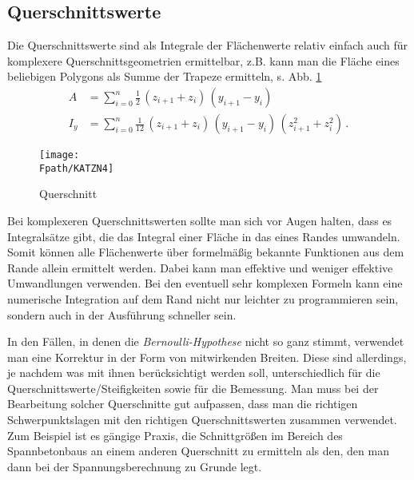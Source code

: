 {\textcolor{sectionTitleBlue}{\subsection{Querschnittswerte}}}
Die Querschnittswerte sind als Integrale der Fl\"{a}chenwerte relativ einfach auch f\"{u}r komplexere Querschnittsgeometrien ermittelbar, z.B. kann man die Fl\"{a}che eines beliebigen Polygons als Summe der Trapeze ermitteln, s. Abb. \ref{KatzN4}
\begin{align}
A &= \sum_{i = 0}^n \frac{1}{2}\,(z_{i+1} + z_i)\,(y_{i+1} - y_i) \\
I_y &= \sum_{i = 0}^n \frac{1}{12}\, (z_{i+1} + z_i)\,(y_{i+1} - y_i)\,(z_{i+1}^2 +
z_i^2)\,.
\end{align}
\begin{figure}[tbp] \centering
\if {} \sidecaption \fi
\texttt{[image: \\Fpath/KATZN4]}
\caption{Querschnitt}
\label{KatzN4}%
\end{figure}%

Bei komplexeren Querschnittswerten sollte man sich vor Augen halten, dass es Integrals\"{a}tze gibt, die das Integral einer Fl\"{a}che in das eines Randes umwandeln. Somit k\"{o}nnen alle Fl\"{a}chenwerte \"{u}ber formelm\"{a}{\ss}ig bekannte Funktionen aus dem Rande allein ermittelt werden. Dabei kann man effektive und weniger effektive Umwandlungen verwenden. Bei den eventuell sehr komplexen Formeln kann eine numerische Integration auf dem Rand nicht nur leichter zu programmieren sein, sondern auch in der Ausf\"{u}hrung schneller sein.

In den F\"{a}llen, in denen die {\em Bernoulli-Hypothese\/} nicht so ganz stimmt, verwendet man eine Korrektur in der Form von mitwirkenden Breiten. Diese sind allerdings, je nachdem was mit ihnen ber\"{u}cksichtigt werden soll, unterschiedlich f\"{u}r die Querschnittswerte/Steifigkeiten sowie f\"{u}r die Bemessung. Man muss bei der Bearbeitung solcher Querschnitte gut aufpassen, dass man die richtigen Schwerpunktslagen mit den richtigen Querschnittswerten zusammen verwendet. Zum Beispiel ist es g\"{a}ngige Praxis, die Schnittgr\"{o}{\ss}en im Bereich des Spannbetonbaus an einem anderen Querschnitt zu ermitteln als den, den man dann bei der Spannungsberechnung zu Grunde legt.

